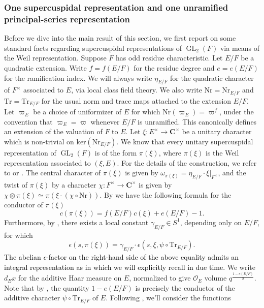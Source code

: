 \documentclass{amsart}
\theoremstyle{plain}
\theoremstyle{plain}
\theoremstyle{remark}
\DeclareMathOperator{\GL}{GL}
\begin{document}
\subsubsection{One supercuspidal representation and one unramified principal-series representation}\label{supercuspidal x unr p-s} 
Before we dive into the main result of this section, we first report on some standard facts regarding supercuspidal representations of $\GL_2(F)$ via means of the Weil representation. 
Suppose $F$ has odd residue characteristic. Let $E/F$ be a quadratic extension. Write $f=f(E/F)$ for the residue degree and $e=e(E/F)$ for the ramification index. We will always write $\eta_{E/F}$ for the quadratic character of $F^\times$ associated to $E$, via local class field theory. We also write $\mathrm{Nr}=\mathrm{Nr}_{E/F}$ and $\mathrm{Tr}=\mathrm{Tr}_{E/F}$ for the usual norm and trace maps attached to the extension $E/F$. Let $\varpi_E$ be a choice of uniformizer of $E$ for which $\mathrm{Nr}(\varpi_E)=\varpi^f$, under the convention that $\varpi_E=\varpi$ whenever $E/F$ is unramified. This canonically defines an extension of the valuation of $F$ to $E$. Let $\xi:E^\times\rightarrow\mathbf{C}^\times$ be a unitary character which is non-trivial on $\mathrm{ker}(\mathrm{Nr}_{E/F})$. We know that every unitary supercuspidal representation of $\GL_2(F)$ is of the form $\pi(\xi)$, where $\pi(\xi)$ is the Weil representation associated to $(\xi,E)$. For the details of the construction, we refer to \cite[$1.1$]{automorphic_on_GL} or \cite[$4.8$]{bump_1997}.
The central character of $\pi(\xi)$ is given by $\omega_{\pi(\xi)}=\eta_{E/F}\cdot \xi|_{F^\times}$, and the twist of $\pi(\xi)$ by a character $\chi:F^\times\rightarrow\mathbf{C}^\times$ is given by $\chi\otimes\pi(\xi)\simeq \pi(\xi\cdot (\chi\circ\mathrm{Nr})).$ By 
\cite[Theorem $2.3.2$]{schmidt2002some} we have the following formula for the conductor of $\pi(\xi)$
$$c(\pi(\xi))=f(E/F)c(\xi)+e(E/F)-1.$$
Furthermore, by \cite[Theorem $4.7$]{automorphic_on_GL}, there exists a local constant $\gamma_{E/F}\in S^1$, depending only on $E/F$, for which
$$\epsilon(s,\pi(\xi))=\gamma_{E/F}\cdot \epsilon(s,\xi,\psi\circ\mathrm{Tr}_{E/F}).$$
 \textcolor{black}{The abelian $\epsilon$-factor on the right-hand side of the above equality admits an integral representation as in \cite[\S $1.1$(iii)]{schmidt2002some} which we will explicitly recall in due time.}
 We write $d_Ex$ for the additive Haar measure on $E$, normalized to give $\mathcal{O}_E$ volume $q^{\tfrac{1-e(E/F)}{2}}$. Note that by \cite[Lemma $2.3.1$]{schmidt2002some}, the quantity $1-e(E/F)$ is precisely the conductor of the additive character $\psi\circ\mathrm{Tr}_{E/F}$ of $E$. Following \cite{Assing_2018}, we'll consider the functions
\end{document}
